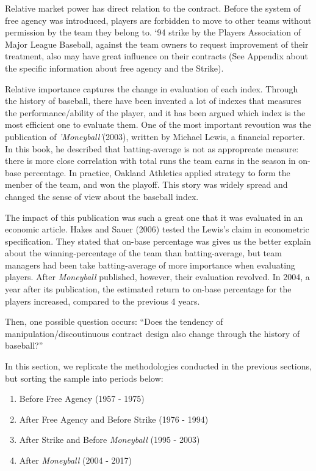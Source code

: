 \documentclass[dvipdfmx, 12pt]{article}
\begin{document}
Relative market power has direct relation to the contract. Before the system of free agency was introduced, players are forbidden to move to other teams without permission by the team they belong to. `94 strike by the Players Association of Major League Baseball, against the team owners to request improvement of their treatment, also may have great influence on their contracts (See Appendix about the specific information about free agency and the Strike).

Relative importance captures the change in evaluation of each index. Through the history of baseball, there have been invented a lot of indexes that measures the performance/ability of the player, and it has been argued which index is the most efficient one to evaluate them. One of the most important revoution was the publication of \textit{'Moneyball'}(2003), written by Michael Lewis, a financial reporter. In this book, he described that batting-average is not as appropreate measure: there is more close correlation with total runs the team earns in the season in on-base percentage. In practice, Oakland Athletics applied strategy to form the menber of the team, and won the playoff. This story was widely spread and changed the sense of view about the baseball index.

The impact of this publication was such a great one that it was evaluated in an economic article. Hakes and Sauer (2006) tested the Lewis's claim in econometric specification. They stated that on-base percentage was gives us the better explain about the winning-percentage of the team than batting-average, but team managers had been take batting-average of more importance when evaluating players. After \textit{Moneyball} published, however, their evaluation revolved. In 2004, a year after its publication, the estimated return to on-base percentage for the players increased, compared to the previous 4 years.

Then, one possible question occurs: ``Does the tendency of manipulation/discoutinuous contract design also change through the history of baseball?''

In this section, we replicate the methodologies conducted in the previous sections, but sorting the sample into periods below:

\begin{enumerate}
  \item Before Free Agency (1957 - 1975)

  \item After Free Agency and Before Strike (1976 - 1994)

  \item After Strike and Before \textit{Moneyball} (1995 - 2003)

  \item After \textit{Moneyball} (2004 - 2017)
\end{enumerate}
\end{document}
